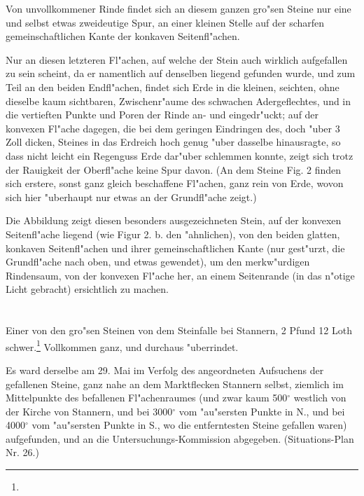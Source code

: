 \documentclass[a4paper, 11pt, oneside, german]{article}
\begin{document}
Von unvollkommener Rinde findet sich an diesem ganzen gro"sen Steine nur eine und selbst etwas zweideutige Spur, an einer kleinen Stelle auf der scharfen gemeinschaftlichen Kante der konkaven Seitenfl"achen.

Nur an diesen letzteren Fl"achen, auf welche der Stein auch wirklich aufgefallen zu sein scheint, da er namentlich auf denselben liegend gefunden wurde, und zum Teil an den beiden Endfl"achen, findet sich Erde in die kleinen, seichten, ohne dieselbe kaum sichtbaren, Zwischenr"aume des schwachen Adergeflechtes, und in die vertieften Punkte und Poren der Rinde an- und eingedr"uckt; auf der konvexen Fl"ache dagegen, die bei dem geringen Eindringen des, doch "uber 3 Zoll dicken, Steines in das Erdreich hoch genug "uber dasselbe hinausragte, so dass nicht leicht ein Regenguss Erde dar"uber schlemmen konnte, zeigt sich trotz der Rauigkeit der Oberfl"ache keine Spur davon. (An dem Steine Fig. 2 finden sich erstere, sonst ganz gleich beschaffene Fl"achen, ganz rein von Erde, wovon sich hier "uberhaupt nur etwas an der Grundfl"ache zeigt.)

Die Abbildung zeigt diesen besonders ausgezeichneten Stein, auf der konvexen Seitenfl"ache liegend (wie Figur 2. b. den "ahnlichen), von den beiden glatten, konkaven Seitenfl"achen und ihrer gemeinschaftlichen Kante (nur gest"urzt, die Grundfl"ache nach oben, und etwas gewendet), um den merkw"urdigen Rindensaum, von der konvexen Fl"ache her, an einem Seitenrande (in das n"otige Licht gebracht) ersichtlich zu machen.
\clearpage
\section{}
\subsection{}
\paragraph{}
Einer von den gro"sen Steinen von dem Steinfalle bei Stannern, 2 Pfund 12 Loth schwer.\footnote{} Vollkommen ganz, und durchaus "uberrindet.

Es ward derselbe am 29. Mai im Verfolg des angeordneten Aufsuchens der gefallenen Steine, ganz nahe an dem Marktflecken Stannern selbst, ziemlich im Mittelpunkte des befallenen Fl"achenraumes (und zwar kaum 500$^{\circ}$ westlich von der Kirche von Stannern, und bei 3000$^{\circ}$ vom "au"sersten Punkte in N., und bei 4000$^{\circ}$ vom "au"sersten Punkte in S., wo die entferntesten Steine gefallen waren) aufgefunden, und an die Untersuchungs-Kommission abgegeben. (Situations-Plan Nr. 26.)
\end{document}
